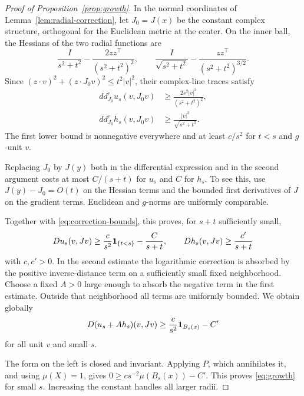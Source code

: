 \begin{proof}[Proof of Proposition~\ref{prop:growth}]
In the normal coordinates of Lemma~\ref{lem:radial-correction},
let \(J_0=J(x)\) be the constant complex structure, orthogonal
for the Euclidean metric at the center. On the inner ball,
the Hessians of the two radial functions are
\[
\frac{I}{s^2+t^2}-\frac{2zz^\top}{(s^2+t^2)^2},
\qquad
\frac{I}{\sqrt{s^2+t^2}}-\frac{zz^\top}{(s^2+t^2)^{3/2}}.
\]
Since
\((z\cdot v)^2+(z\cdot J_0v)^2\le t^2|v|^2\), their
complex-line traces satisfy
\begin{align}
dd^c_{J_0}u_s(v,J_0v)
&\ge\frac{2s^2|v|^2}{(s^2+t^2)^2},\label{eq:log-trace}\\
dd^c_{J_0}h_s(v,J_0v)
&\ge\frac{|v|^2}{\sqrt{s^2+t^2}}.\label{eq:sqrt-trace}
\end{align}
The first lower bound is nonnegative everywhere and at least
\(c/s^2\) for \(t<s\) and \(g\)-unit \(v\).

Replacing \(J_0\) by \(J(y)\) both in the differential expression
and in the second argument costs at most \(C/(s+t)\) for
\(u_s\) and \(C\) for \(h_s\). To see this, use
\(J(y)-J_0=O(t)\) on the Hessian terms and the bounded first
derivatives of \(J\) on the gradient terms. Euclidean and
\(g\)-norms are uniformly comparable.

Together with \eqref{eq:correction-bounds}, this proves,
for \(s+t\) sufficiently small,
\[
Du_s(v,Jv)\ge \frac{c}{s^2}\mathbf 1_{\{t<s\}}-\frac{C}{s+t},
\qquad
Dh_s(v,Jv)\ge \frac{c'}{s+t}
\]
with \(c,c'>0\). In the second estimate the logarithmic
correction is absorbed by the positive inverse-distance
term on a sufficiently small fixed neighborhood.
Choose a fixed \(A>0\) large enough to absorb the negative
term in the first estimate. Outside that neighborhood all
terms are uniformly bounded. We obtain globally
\[
D(u_s+Ah_s)(v,Jv)\ge
\frac{c}{s^2}\mathbf 1_{B_s(x)}-C'
\]
for all unit \(v\) and small \(s\).

The form on the left is closed and invariant. Applying \(P\),
which annihilates it, and using \(\mu(X)=1\), gives
\(0\ge cs^{-2}\mu(B_s(x))-C'\).
This proves \eqref{eq:growth} for small \(s\). Increasing
the constant handles all larger radii.
\end{proof}

